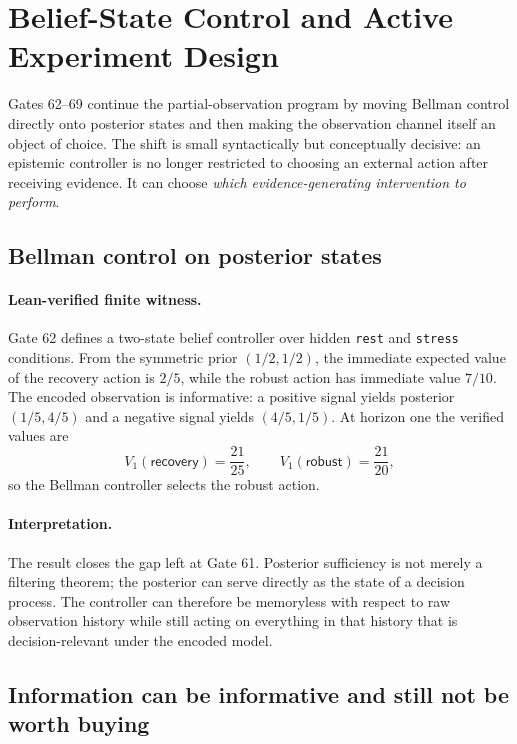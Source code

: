 \section{Belief-State Control and Active Experiment Design}

Gates 62--69 continue the partial-observation program by moving Bellman control directly onto posterior states and then making the observation channel itself an object of choice. The shift is small syntactically but conceptually decisive: an epistemic controller is no longer restricted to choosing an external action after receiving evidence. It can choose \emph{which evidence-generating intervention to perform}.

\subsection{Bellman control on posterior states}

\paragraph{Lean-verified finite witness.}
Gate 62 defines a two-state belief controller over hidden \texttt{rest} and \texttt{stress} conditions. From the symmetric prior $(1/2,1/2)$, the immediate expected value of the recovery action is $2/5$, while the robust action has immediate value $7/10$. The encoded observation is informative: a positive signal yields posterior $(1/5,4/5)$ and a negative signal yields $(4/5,1/5)$. At horizon one the verified values are
\[
V_1(\mathsf{recovery})=\frac{21}{25},
\qquad
V_1(\mathsf{robust})=\frac{21}{20},
\]
so the Bellman controller selects the robust action.

\paragraph{Interpretation.}
The result closes the gap left at Gate 61. Posterior sufficiency is not merely a filtering theorem; the posterior can serve directly as the state of a decision process. The controller can therefore be memoryless with respect to raw observation history while still acting on everything in that history that is decision-relevant under the encoded model.

\subsection{Information can be informative and still not be worth buying}

